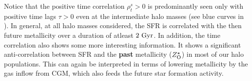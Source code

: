 

Notice that the positive time correlation $\rho^s_t>0$ is predominantly seen only with positive time lags $\tau>0$ even at the intermediate halo masses (see blue curves in ). In general, at all halo masses considered, the SFR is correlated with the then future metallicity over a duration of atleast $2~\rm{Gyr}$. In addition, the time correlation also shows some more interesting information. It shows a significant anti-correlation between SFR and the \textbf{past} metallicity ($Z^{\star}_{\rm{O}}$) in most of our halo populations. This can again be interpreted in terms of lowering metallicity by the gas inflow from CGM, which also feeds the future star formation activity. 


